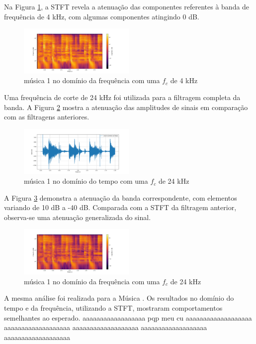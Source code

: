Na Figura \ref{fig27}, a STFT revela a atenuação das componentes referentes à banda de frequência de 4 kHz, com algumas componentes atingindo 0 dB.

\begin{figure}[h]
	\centering
    \includegraphics[width=0.5\textwidth]{figuras/fig27.png}
	\caption{música 1 no domínio da frequência com uma $f_c$ de 4 kHz}
	\label{fig27}
\end{figure}

Uma frequência de corte de 24 kHz foi utilizada para a filtragem completa da banda. A Figura \ref{fig30} mostra a atenuação das amplitudes de sinais em comparação com as filtragens anteriores.

\begin{figure}[h]
	\centering
    \includegraphics[width=0.5\textwidth]{figuras/fig30.png}
	\caption{música 1 no domínio do tempo com uma $f_c$ de 24 kHz}
	\label{fig30}
\end{figure}

A Figura \ref{fig31} demonstra a atenuação da banda correspondente, com elementos variando de 10 dB a -40 dB. Comparada com a STFT da filtragem anterior, observa-se uma atenuação generalizada do sinal.

\begin{figure}[h]
	\centering
    \includegraphics[width=0.5\textwidth]{figuras/fig31.png}
	\caption{música 1 no domínio da frequência com uma $f_c$ de 24 kHz}
	\label{fig31}
\end{figure}

A mesma análise foi realizada para a Música \cite{track02}. Os resultados no domínio do tempo e da frequência, utilizando a STFT, mostraram comportamentos semelhantes ao esperado.
aaaaaaaaaaaaaaaaaa
pqp meu cu
aaaaaaaaaaaaaaaaaaa
aaaaaaaaaaaaaaaaaaa
aaaaaaaaaaaaaaaaaaa
aaaaaaaaaaaaaaaaaaa
aaaaaaaaaaaaaaaaaaa

